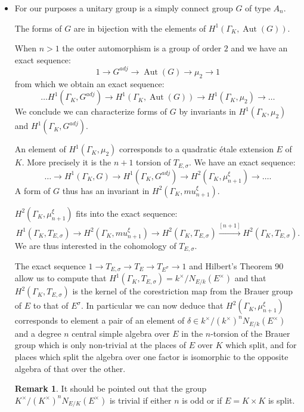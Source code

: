 \documentclass{article}
\theoremstyle{plain}
\theoremstyle{definition}
\newtheorem{remark}[theorem]{Remark}
\DeclareMathOperator{\Aut}{Aut}
\newcommand{\GalKbK}{\Gamma_K}
\begin{document}
\begin{itemize}
\item 

For our purposes a unitary group is a simply connect group $G$ of type $A_n$.


The forms of $G$ are in bijection with the elements of $H^1(\GalKbK, \Aut(G))$.

When $n>1$ the outer automorphism is a group of order $2$ and we have an exact sequence:
\[ 1 \rightarrow   G^{adj} \rightarrow \Aut(G) \rightarrow \mu_2  \rightarrow 1 \]
from which we obtain an exact sequence:
\[ \ldots  H^1(\GalKbK, G^{adj})  \rightarrow  H^1(\GalKbK, \Aut(G)) \rightarrow  H^1(\GalKbK, \mu_2) \rightarrow \ldots \]
We conclude we can characterize forms of $G$ by invariants in $H^1(\GalKbK, \mu_2)$ and $H^1(\GalKbK, G^{adj})$.

An element of $H^1(\GalKbK, \mu_2)$ corresponds to a quadratic \'etale extension $E$ of $K$.
More precisely it is the $n+1$ torsion of $T_{E,\sigma}$.
We have an exact sequence:
\[ \ldots \rightarrow H^1(\GalKbK,G) \rightarrow H^1(\GalKbK, G^{adj}) \rightarrow H^2(\GalKbK, \mu_{n+1}^\xi) \rightarrow \ldots. \]
A form of $G$ thus has an invariant in $H^2(\GalKbK, mu_{n+1}^\xi)$.

$H^2(\GalKbK, \mu_{n+1}^\xi)$ fits into the exact sequence:
\[ H^1(\GalKbK, T_{E,\sigma}) \rightarrow H^2(\GalKbK, mu_{n+1}^\xi) \rightarrow H^2(\GalKbK, T_{E,\sigma}) \overset{[n+1]}\rightarrow H^2(\GalKbK, T_{E,\sigma}). \]
We are thus interested in the cohomology of $T_{E,\sigma}$.

The exact sequence $1 \rightarrow T_{E,\sigma} \rightarrow T_E \rightarrow T_{E^\sigma} \rightarrow 1$ and Hilbert's Theorem 90 allow us to compute that 
$H^1(\GalKbK, T_{E,\sigma}) = k^\times/N_{E/k}(E^\times)$ and that $H^2(\GalKbK, T_{E,\sigma})$ is the kernel of the corestriction map from the Brauer group of $E$ to that of $E^\sigma$.
In particular we can now deduce that $H^2(\GalKbK, \mu_{n+1}^\xi)$ corresponds to element a pair of an element of $\delta\in k^\times/(k^\times)^nN_{E/k}(E^\times)$ and a degree $n$ central simple algebra over $E$ in the $n$-torsion of the Brauer group which is only non-trivial at the places of $E$ over $K$ which split, and for places which split the algebra over one factor is isomorphic to the opposite algebra of that over the other.

\begin{remark}
It should be pointed out that the group $K^\times/(K^\times)^nN_{E/K}(E^\times)$ is trivial if either $n$ is odd or if $E = K\times K$ is split.
\end{remark} 


\end{itemize}
\end{document}
